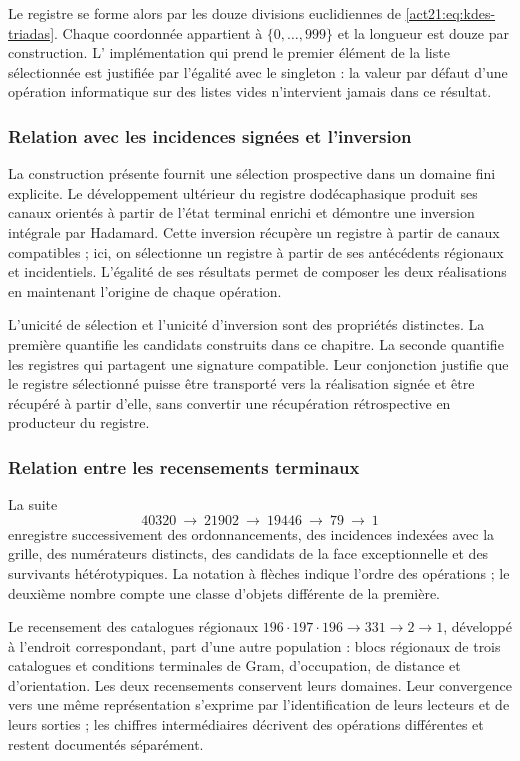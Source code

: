 Le registre se forme alors par les douze divisions euclidiennes de
\eqref{act21:eq:kdes-triadas}. Chaque coordonnée appartient à
$\{0,\ldots,999\}$ et la longueur est douze par construction. L'
implémentation qui prend le premier élément de la liste sélectionnée
est justifiée par l'égalité avec le singleton : la valeur par défaut
d'une opération informatique sur des listes vides n'intervient jamais dans
ce résultat.

\subsubsection{Relation avec les incidences signées et l'inversion}

La construction présente fournit une sélection prospective dans un
domaine fini explicite. Le développement ultérieur du registre
dodécaphasique produit ses canaux orientés à partir de l'état
terminal enrichi et démontre une inversion intégrale par
Hadamard. Cette inversion récupère un registre à partir de canaux
compatibles ; ici, on sélectionne un registre à partir de ses
antécédents régionaux et incidentiels. L'égalité de ses résultats
permet de composer les deux réalisations en maintenant l'origine de chaque
opération.

L'unicité de sélection et l'unicité d'inversion sont des propriétés distinctes. La première quantifie les candidats construits dans ce chapitre. La seconde quantifie les registres qui partagent une signature compatible. Leur conjonction justifie que le registre sélectionné puisse être transporté vers la réalisation signée et être récupéré à partir d'elle, sans convertir une récupération rétrospective en producteur du registre.

\subsubsection{Relation entre les recensements terminaux}
\label{act21:sec:relacion-censos}

La suite
\[
 40320\ \longrightarrow\ 21902\ \longrightarrow\ 19446
 \ \longrightarrow\ 79\ \longrightarrow\ 1
\]
enregistre successivement des ordonnancements, des incidences indexées avec la grille, des numérateurs distincts, des candidats de la face exceptionnelle et des survivants hétérotypiques. La notation à flèches indique l'ordre des opérations ; le deuxième nombre compte une classe d'objets différente de la première.

Le recensement des catalogues régionaux
$196\cdot197\cdot196\longrightarrow331\longrightarrow2
\longrightarrow1$, développé à l'endroit correspondant, part d'une
autre population : blocs régionaux de trois catalogues et conditions
terminales de Gram, d'occupation, de distance et d'orientation. Les deux recensements
conservent leurs domaines. Leur convergence vers une même représentation
s'exprime par l'identification de leurs lecteurs et de leurs sorties ;
les chiffres intermédiaires décrivent des opérations différentes et restent
documentés séparément.

